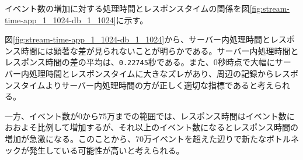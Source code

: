 \documentclass[../../../../../main]{subfiles}
\begin{document}
    \label{subsubsec:result-streaming-only-limit-time}

    イベント数の増加に対する処理時間とレスポンスタイムの関係を図\ref{fig:stream-time-app_1_1024-db_1_1024}に示す。

    

    図\ref{fig:stream-time-app_1_1024-db_1_1024}から、サーバー内処理時間とレスポンス時間には顕著な差が見られないことが明らかである。サーバー内処理時間とレスポンス時間の差の平均は、\texttt{0.22745}秒である。また、0秒時点で大幅にサーバー内処理時間とレスポンスタイムに大きなズレがあり、周辺の記録からレスポンスタイムよりサーバー内処理時間の方が正しく適切な指標であると考えられる。

    一方、イベント数が0から75万までの範囲では、レスポンス時間はイベント数におおよそ比例して増加するが、それ以上のイベント数になるとレスポンス時間の増加が急激になる。このことから、70万イベントを超えた辺りで新たなボトルネックが発生している可能性が高いと考えられる。
\end{document}

